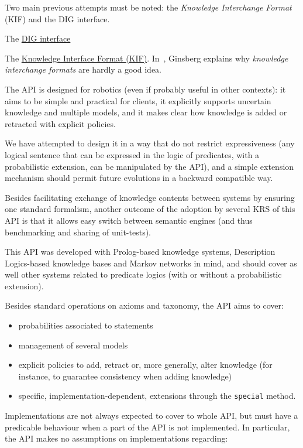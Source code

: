 Two main previous attempts must be noted: the \emph{Knowledge Interchange
Format} (KIF) and the DIG interface.

The \href{http://dig.sourceforge.net/}{ DIG interface}

The \href{http://logic.stanford.edu/kif/dpans.html}{ Knowledge Interface Format
(KIF)}. In~\cite{Ginsberg1991}, Ginsberg explains why \emph{knowledge
interchange formats} are hardly a good idea.

The API is designed for robotics (even if probably useful in other contexts):
it aims to be simple and practical for clients, it explicitly supports
uncertain knowledge and multiple models, and it makes clear how knowledge is
added or retracted with explicit policies.

We have attempted to design it in a way that do not restrict expressiveness
(any logical sentence that can be expressed in the logic of predicates, with a
probabilistic extension, can be manipulated by the API), and a simple extension
mechanism should permit future evolutions in a backward compatible way.

Besides facilitating exchange of knowledge contents between systems by ensuring
one standard formalism, another outcome of the adoption by several KRS of this
API is that it allows easy switch between semantic engines (and thus
benchmarking and sharing of unit-tests).

This API was developed with Prolog-based knowledge systems, Description
Logics-based knowledge bases and Markov networks in mind, and should cover as
well other systems related to predicate logics (with or without a probabilistic
extension).

Besides standard operations on axioms and taxonomy, the API aims to cover:

\begin{itemize}
    \item  probabilities associated to statements
    \item  management of several models
    \item  explicit policies to add, retract or, more generally, alter 
    knowledge (for instance, to guarantee consistency when adding knowledge)
    \item  specific, implementation-dependent, extensions through the
    \texttt{special} method.
\end{itemize}

Implementations are not always expected to cover to whole API, but must have a
predicable behaviour when a part of the API is not implemented. In particular,
the API makes no assumptions on implementations regarding:


